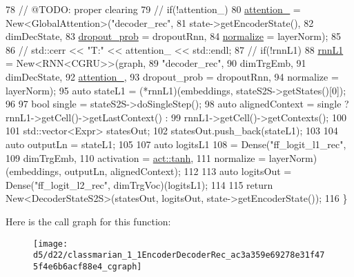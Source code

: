 \begin{DoxyCode}
78     \textcolor{comment}{// @TODO: proper clearing}
79     \textcolor{comment}{// if(!attention\_)}
80     \hyperlink{classmarian_1_1EncoderDecoderRec_ad4768d4a33e83b3fc280f666df286269}{attention\_} = New<GlobalAttention>(\textcolor{stringliteral}{"decoder\_rec"},
81                                       state->getEncoderState(),
82                                       dimDecState,
83                                       \hyperlink{namespacemarian_1_1keywords_aeb1a41f81a79487b23aa2f8769a205bf}{dropout\_prob} = dropoutRnn,
84                                       \hyperlink{namespacemarian_1_1keywords_a0865ee916b32905390a7c6e6bdfd8a9f}{normalize} = layerNorm);
85 
86     \textcolor{comment}{// std::cerr << "T:" << attention\_ << std::endl;}
87     \textcolor{comment}{// if(!rnnL1)}
88     \hyperlink{classmarian_1_1EncoderDecoderRec_ad0d471b436beab644c14a8b692a4d53f}{rnnL1} = New<RNN<CGRU>>(graph,
89                            \textcolor{stringliteral}{"decoder\_rec"},
90                            dimTrgEmb,
91                            dimDecState,
92                            \hyperlink{classmarian_1_1EncoderDecoderRec_ad4768d4a33e83b3fc280f666df286269}{attention\_},
93                            dropout\_prob = dropoutRnn,
94                            normalize = layerNorm);
95     \textcolor{keyword}{auto} stateL1 = (*rnnL1)(embeddings, stateS2S->getStates()[0]);
96 
97     \textcolor{keywordtype}{bool} single = stateS2S->doSingleStep();
98     \textcolor{keyword}{auto} alignedContext = single ? rnnL1->getCell()->getLastContext() :
99                                    rnnL1->getCell()->getContexts();
100 
101     std::vector<Expr> statesOut;
102     statesOut.push\_back(stateL1);
103 
104     \textcolor{keyword}{auto} outputLn = stateL1;
105 
107     \textcolor{keyword}{auto} logitsL1
108         = Dense(\textcolor{stringliteral}{"ff\_logit\_l1\_rec"},
109                 dimTrgEmb,
110                 activation = \hyperlink{namespacemarian_ab84fcdb2b1fa95f89e3921aea4027957}{act::tanh},
111                 normalize = layerNorm)(embeddings, outputLn, alignedContext);
112 
113     \textcolor{keyword}{auto} logitsOut = Dense(\textcolor{stringliteral}{"ff\_logit\_l2\_rec"}, dimTrgVoc)(logitsL1);
114 
115     \textcolor{keywordflow}{return} New<DecoderStateS2S>(statesOut, logitsOut, state->getEncoderState());
116   \}
\end{DoxyCode}


Here is the call graph for this function\+:
\nopagebreak
\begin{figure}[H]
\begin{center}
\leavevmode
\texttt{[image: d5/d22/classmarian\_1\_1EncoderDecoderRec\_ac3a359e69278e31f475f4e6b6acf88e4\_cgraph]}
\end{center}
\end{figure}




